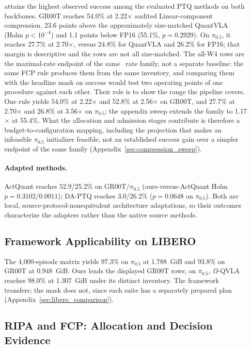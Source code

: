 \method attains the highest observed success among the evaluated PTQ methods on both backbones. GR00T reaches 54.0\% at 2.22$\times$ audited Linear-component compression, 23.6 points above the approximately size-matched QuantVLA (Holm $p<10^{-4}$) and 1.1 points below FP16 (55.1\%, $p=0.2929$). On $\pi_{0.5}$, it reaches 27.7\% at 2.70$\times$, versus 24.8\% for QuantVLA and 26.2\% for FP16; that margin is descriptive and the rows are not all size-matched. The all-W4 rows are the maximal-rate endpoint of the same \method\ rate family, not a separate baseline: the same FCP rule produces them from the same inventory, and comparing them with the headline mask on success would test two operating points of one procedure against each other. Their role is to show the range the pipeline covers. One rule yields 54.0\% at 2.22$\times$ and 52.8\% at 2.56$\times$ on GR00T, and 27.7\% at 2.70$\times$ and 26.8\% at 3.56$\times$ on $\pi_{0.5}$; the appendix sweep extends the family to 1.17$\times$ at 55.4\%. What the allocation and admission stages contribute is therefore a budget-to-configuration mapping, including the projection that makes an infeasible $\pi_{0.5}$ initializer feasible, not an established success gain over a simpler endpoint of the same family (Appendix~\ref{sec:compression_sweep}).

\paragraph{Adapted methods.}
ActQuant reaches 52.9/25.2\% on GR00T/$\pi_{0.5}$ (ours-versus-ActQuant Holm $p=0.3102/0.0011$); DA-PTQ reaches 3.0/26.2\% ($p=0.0648$ on $\pi_{0.5}$). Both are local, source-protocol-nonequivalent architecture adaptations, so their outcomes characterize the adapters rather than the native source methods.

\subsection{Framework Applicability on LIBERO}
\label{sec:libero_main}


The 4,000-episode matrix yields 97.3\% on $\pi_{0.5}$ at 1.788~GiB and 93.8\% on GR00T at 0.948~GiB. Ours leads the displayed GR00T rows; on $\pi_{0.5}$, $\Omega$-QVLA reaches 98.0\% at 1.307~GiB under its distinct inventory. The framework transfers; the mask does not, since each suite has a separately prepared plan (Appendix~\ref{sec:libero_comparison}).

\subsection{RIPA and FCP: Allocation and Decision Evidence}
\label{sec:pi05_fcp_main}

